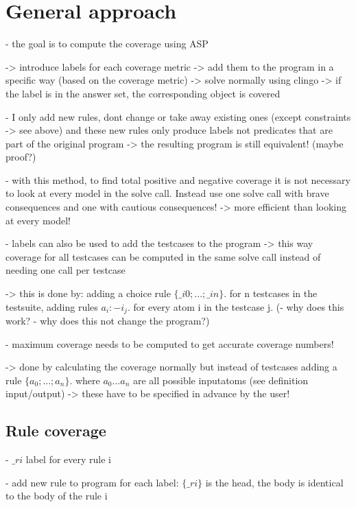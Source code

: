\section{General approach}
\label{sec:Computing coverage metrics for propositional programs/General approach}
- the goal is to compute the coverage using ASP

-> introduce labels for each coverage metric -> add them to the program in a specific way (based on the coverage metric)  -> solve 
normally using clingo -> if the label is in the answer set, the corresponding object is covered

- I only add new rules, dont change or take away existing ones (except constraints -> see above) and these new rules only produce 
labels not predicates that are part of the original program -> the resulting program is still equivalent! (maybe proof?)

- with this method, to find total positive and negative coverage it is not necessary to look at every model in the solve call. 
Instead use one solve call with brave consequences and one with cautious consequences! -> more efficient than looking at every model!

- labels can also be used to add the testcases to the program -> this way coverage for all testcases can be computed in the same solve 
call instead of needing one call per testcase

-> this is done by: adding a choice rule $\{\_i0;...;\_in\}$. for n testcases in the testsuite, adding rules $a_i :- i_j$. for every atom i 
in the testcase j.
(- why does this work?
- why does this not change the program?)

- maximum coverage needs to be computed to get accurate coverage numbers!

-> done by calculating the coverage normally but instead of testcases adding a rule $\{a_0;...;a_n\}$. where $a_0...a_n$ are all possible 
inputatoms (see definition input/output) -> these have to be specified in advance by the user!

\subsection{Rule coverage}
\label{subsec:Computing coverage metrics for propositional programs/General approach/Rule coverage}
- $\_ri$ label for every rule i

- add new rule to program for each label: $\{\_ri\}$ is the head, the body is identical to the body of the rule i

